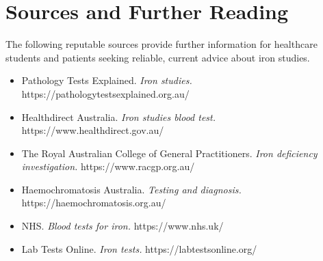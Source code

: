 \section*{Sources and Further Reading}
The following reputable sources provide further information for healthcare students and patients seeking reliable, current advice about iron studies.
\begin{itemize}
    \item Pathology Tests Explained. \textit{Iron studies.} https://pathologytestsexplained.org.au/
    \item Healthdirect Australia. \textit{Iron studies blood test.} https://www.healthdirect.gov.au/
    \item The Royal Australian College of General Practitioners. \textit{Iron deficiency investigation.} https://www.racgp.org.au/
    \item Haemochromatosis Australia. \textit{Testing and diagnosis.} https://haemochromatosis.org.au/
    \item NHS. \textit{Blood tests for iron.} https://www.nhs.uk/
    \item Lab Tests Online. \textit{Iron tests.} https://labtestsonline.org/
\end{itemize}
